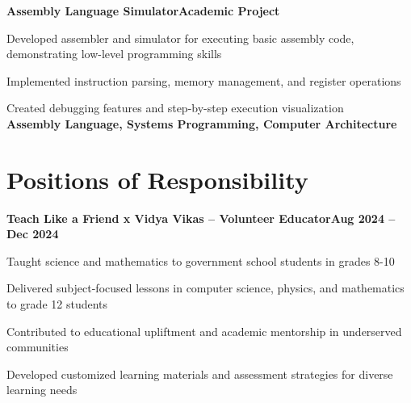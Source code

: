 \documentclass[letterpaper,10pt]{article}
\newcommand{\heading}[2]{
  \hspace{10pt}#1\hfill#2\\
}
\newcommand{\headingBf}[2]{
  \heading{\textbf{#1}}{\textbf{#2}}
}
\newenvironment{resume_list}{
  \vspace{-7pt}
  \begin{itemize}[itemsep=-2px, parsep=1pt, leftmargin=30pt]
}{
  \end{itemize}
}
\begin{document}
  \headingBf{Assembly Language Simulator}{Academic Project}
  \begin{resume_list}
    \item Developed assembler and simulator for executing basic assembly code, demonstrating low-level programming skills
    \item Implemented instruction parsing, memory management, and register operations
    \item Created debugging features and step-by-step execution visualization
    \\
    \textbf{Assembly Language, Systems Programming, Computer Architecture}
  \end{resume_list}


  \section{Positions of Responsibility}

  \headingBf{Teach Like a Friend x Vidya Vikas -- Volunteer Educator}{Aug 2024 -- Dec 2024}
  \begin{resume_list}
    \item Taught science and mathematics to government school students in grades 8-10
    \item Delivered subject-focused lessons in computer science, physics, and mathematics to grade 12 students
    \item Contributed to educational upliftment and academic mentorship in underserved communities
    \item Developed customized learning materials and assessment strategies for diverse learning needs
  \end{resume_list}
\end{document}
